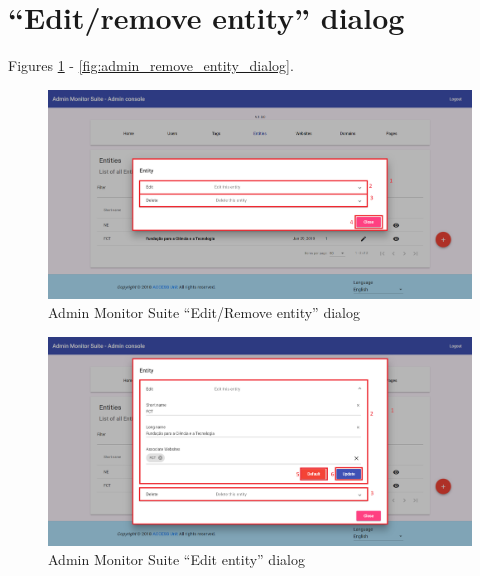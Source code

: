 \section{``Edit/remove entity'' dialog}
\label{sec:admin_edit_entity_dialog}

Figures \ref{fig:admin_edit_remove_entity_dialog} - \ref{fig:admin_remove_entity_dialog}.

\begin{figure}[H]
    \centering
    \includegraphics[width=\linewidth]{lib/images/admin/admin_edit_remove_entity_dialog.png}
    \caption{Admin Monitor Suite ``Edit/Remove entity'' dialog}
    \label{fig:admin_edit_remove_entity_dialog}
\end{figure}

\clearpage

\begin{figure}[H]
    \centering
    \includegraphics[width=\linewidth]{lib/images/admin/admin_edit_entity_dialog.png}
    \caption{Admin Monitor Suite ``Edit entity'' dialog}
    \label{fig:admin_edit_entity_dialog}
\end{figure}

